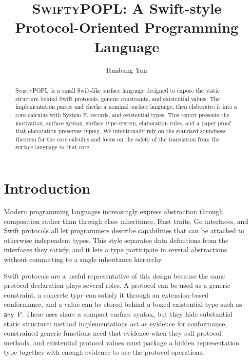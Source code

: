 \documentclass[manuscript,nonacm]{acmart}
\newcommand{\lang}{\textsc{SwiftyPOPL}}
\newcommand{\kw}[1]{\ensuremath{\mathsf{#1}}}
\newcommand{\Any}[1]{\kw{any}\ #1}
\begin{document}
\title{\lang: A Swift-style Protocol-Oriented Programming Language}

\author{Runbang Yan}

\renewcommand{\shortauthors}{Yan}

\begin{abstract}
\lang\ is a small Swift-like surface language designed to expose the static structure behind Swift protocols, generic constraints, and existential values.
The implementation parses and checks a nominal surface language, then elaborates it into a core calculus with System F, records, and existential types.
This report presents the motivation, surface syntax, surface type system, elaboration rules, and a paper proof that elaboration preserves typing.
We intentionally rely on the standard soundness theorem for the core calculus and focus on the safety of the translation from the surface language to that core.
\end{abstract}

\maketitle

\section{Introduction}

Modern programming languages increasingly express abstraction through composition rather than through class inheritance.
Rust traits, Go interfaces, and Swift protocols all let programmers describe capabilities that can be attached to otherwise independent types.
This style separates data definitions from the interfaces they satisfy, and it lets a type participate in several abstractions without committing to a single inheritance hierarchy.

Swift protocols are a useful representative of this design because the same protocol declaration plays several roles.
A protocol can be used as a generic constraint, a concrete type can satisfy it through an extension-based conformance, and a value can be stored behind a boxed existential type such as \Any{P}.
These uses share a compact surface syntax, but they hide substantial static structure:
method implementations act as evidence for conformance, constrained generic functions need that evidence when they call protocol methods, and existential protocol values must package a hidden representation type together with enough evidence to use the protocol operations.
\end{document}
